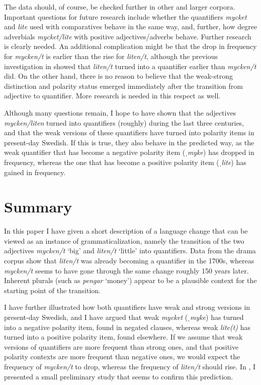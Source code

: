 \documentclass[output=paper]{langscibook}
\begin{document}
The data should, of course, be checked further in other and larger corpora. Important questions for future research include whether the quantifiers \textit{mycket} and \textit{lite} used with comparatives behave in the same way, and, further, how degree adverbials \textit{mycket/lite} with positive adjectives/adverbs behave. Further research is clearly needed. An additional complication might be that the drop in frequency for \textit{mycken/t} is earlier than the rise for \textit{liten/t}, although the previous investigation in  showed that \textit{liten/t} turned into a quantifier earlier than \textit{mycken/t} did. On the other hand, there is no reason to believe that the weak-strong distinction and polarity status emerged immediately after the transition from adjective to quantifier. More research is needed in this respect as well.



Although many questions remain, I hope to have shown that the adjectives \textit{mycken/liten} turned into quantifiers (roughly) during the last three centuries, and that the weak versions of these quantifiers have turned into polarity items in present-day Swedish. If this is true, they also behave in the predicted way, as the weak quantifier that has become a negative polarity item (\textit{ˌmyke}) has dropped in frequency, whereas the one that has become a positive polarity item (\textit{ˌlite}) has gained in frequency.


\section{Summary}\label{sec:delsing:7}


In this paper I have given a short description of a language change that can be viewed as an instance of grammaticalization, namely the transition of the two adjectives \textit{mycken/t} ‘big’ and \textit{liten/t} ‘little’ into quantifiers. Data from the drama corpus show that \textit{liten/t} was already becoming a quantifier in the 1700s, whereas \textit{mycken/t} seems to have gone through the same change roughly 150 years later. Inherent plurals (such as \textit{pengar} ‘money’) appear to be a plausible context for the starting point of the transition.



I have further illustrated how both quantifiers have weak and strong versions in present-day Swedish, and I have argued that weak \textit{mycket} (\textit{ˌmyke}) has turned into a negative polarity item, found in negated clauses, whereas weak \textit{lite(t)} has turned into a positive polarity item, found elsewhere. If we assume that weak versions of quantifiers are more frequent than strong ones, and that positive polarity contexts are more frequent than negative ones, we would expect the frequency of \textit{mycken/t} to drop, whereas the frequency of \textit{liten/t} should rise. In , I presented a small preliminary study that seems to confirm this prediction.
\end{document}
